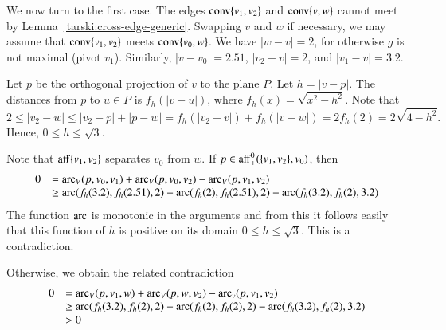 \begin{tarskidata}
\begin{tarski}
\begin{proved}
We now turn to the first case.  The edges ${\operatorname{conv}}\{v_1,v_2\}$ and ${\operatorname{conv}}\{v,w\}$
cannot meet by Lemma~\ref{tarski:cross-edge-generic}.  Swapping $v$ and $w$ if necessary,
we may assume that ${\operatorname{conv}}\{v_1,v_2\}$ meets ${\operatorname{conv}}\{v_0,w\}$.  We have
$|w-v|=2$, for otherwise $g$ is not maximal (pivot $v_1$).  Similarly, $|v-v_0|=2.51$,
$|v_2-v|=2$, and $|v_1-v|=3.2$.



Let $p$ be the orthogonal projection of $v$ to the plane $P$.  Let
$h=|v-p|$. 
The distances from $p$ to $u\in P$ is
$f_h(|v-u|)$, where $f_h(x)=\sqrt{x^2-h^2}$.
Note that
$$
2\le |v_2-w|\le |v_2-p|+|p-w|=f_h(|v_2-v|)+f_h(|v-w|) = 2 f_h(2) = 2\sqrt{4-h^2}.
$$
Hence, $0\le h \le\sqrt3$.


Note that ${\operatorname{aff}}\{v_1,v_2\}$ separates $v_0$ from $w$.  If
$p\in {\operatorname{aff}}_+^0(\{v_1,v_2\},v_0)$, then 
 $$
\begin{array}{lll}
    0&=\operatorname{arc}_V(p,v_0,v_1)+
    \operatorname{arc}_V(p,v_0,v_2)- \operatorname{arc}_V(p,v_1,v_2)\\
    &\ge \operatorname{arc}(f_h(3.2),f_h(2.51),2)+
    \operatorname{arc}(f_h(2),f_h(2.51),2)-\operatorname{arc}(f_h(3.2),f_h(2),3.2)
\end{array}
 $$
The function $\operatorname{arc}$ is monotonic in the arguments and from this it
follows easily that this function of $h$ is positive on its domain
$0\le h\le \sqrt3$. This is a contradiction.  

Otherwise, we obtain the
related contradiction
  $$
\begin{array}{lll}
    0&=\operatorname{arc}_V(p,v_1,w)+
    \operatorname{arc}_V(p,w,v_2)-
    \operatorname{arc}_v(p,v_1,v_2)\\
    &\ge \operatorname{arc}(f_h(3.2),f_h(2),2)+
    \operatorname{arc}(f_h(2),f_h(2),2)-\operatorname{arc}(f_h(3.2),f_h(2),3.2)\\
    &>0
\end{array}
  $$
\swallowed\end{proved}
\end{tarski}






\end{tarskidata}
